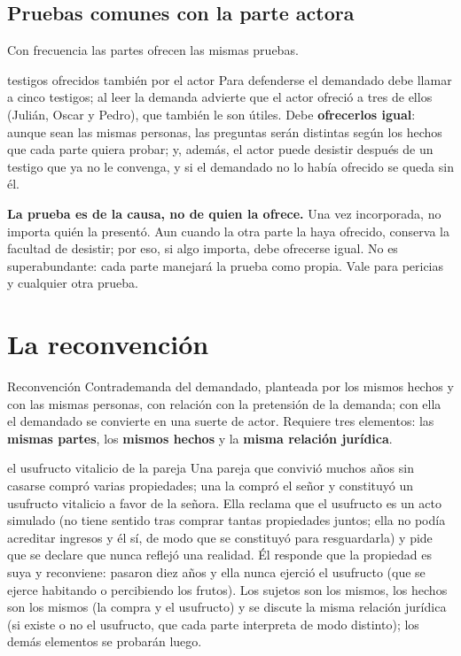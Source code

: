 \documentclass[12pt,oneside]{book}
\begin{document}
\subsection{Pruebas comunes con la parte actora}

Con frecuencia las partes ofrecen las mismas pruebas.

\begin{ejemplo}{testigos ofrecidos también por el actor}
Para defenderse el demandado debe llamar a cinco testigos; al leer la demanda advierte que el actor ofreció a tres de ellos (Julián, Oscar y Pedro), que también le son útiles. Debe \textbf{ofrecerlos igual}: aunque sean las mismas personas, las preguntas serán distintas según los hechos que cada parte quiera probar; y, además, el actor puede desistir después de un testigo que ya no le convenga, y si el demandado no lo había ofrecido se queda sin él.
\end{ejemplo}

\begin{importante}
\textbf{La prueba es de la causa, no de quien la ofrece.} Una vez incorporada, no importa quién la presentó. Aun cuando la otra parte la haya ofrecido, conserva la facultad de desistir; por eso, si algo importa, debe ofrecerse igual. No es superabundante: cada parte manejará la prueba como propia. Vale para pericias y cualquier otra prueba.
\end{importante}

\section{La reconvención}

\begin{definicion}{Reconvención}
Contrademanda del demandado, planteada por los mismos hechos y con las mismas personas, con relación con la pretensión de la demanda; con ella el demandado se convierte en una suerte de actor. Requiere tres elementos: las \textbf{mismas partes}, los \textbf{mismos hechos} y la \textbf{misma relación jurídica}.
\end{definicion}

\begin{ejemplo}{el usufructo vitalicio de la pareja}
Una pareja que convivió muchos años sin casarse compró varias propiedades; una la compró el señor y constituyó un usufructo vitalicio a favor de la señora. Ella reclama que el usufructo es un acto simulado (no tiene sentido tras comprar tantas propiedades juntos; ella no podía acreditar ingresos y él sí, de modo que se constituyó para resguardarla) y pide que se declare que nunca reflejó una realidad. Él responde que la propiedad es suya y reconviene: pasaron diez años y ella nunca ejerció el usufructo (que se ejerce habitando o percibiendo los frutos). Los sujetos son los mismos, los hechos son los mismos (la compra y el usufructo) y se discute la misma relación jurídica (si existe o no el usufructo, que cada parte interpreta de modo distinto); los demás elementos se probarán luego.
\end{ejemplo}
\end{document}
